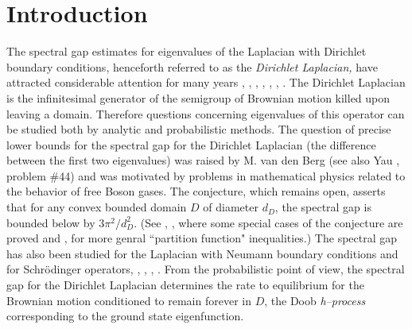 \documentclass[11pt,leqno]{article}
\theoremstyle{definition}
\numberwithin{equation}{section}
\begin{document}
\begin{titlepage}
\begin{abstract}
\smallskip

\centerline{\bf  Contents}
\begin{itemize}
\item[{\S1.}] {\sl Introduction}
\item[\S2.] {\sl  Variational formulas}
\item[\S3.] {\sl Weighted Poincar\'e inequalities}
\item[\S4.] {\sl Proof of Theorems \ref{main} and \ref{upperestimate}}
\item[\S5.] { \sl Concluding Remarks}
\end{itemize}
\end{abstract}
\end{titlepage}







\section{Introduction} 
\label{sec:introduction}

  The spectral gap estimates for eigenvalues of the Laplacian with Dirichlet
boundary conditions, henceforth referred to as the {\it Dirichlet Laplacian,}  have attracted
considerable  attention for many  years
\cite{AB1},
\cite{AB2}, \cite{vanden}, \cite{L}, \cite{Sm}, \cite{SWY}, \cite{YZ} . The Dirichlet
Laplacian is the infinitesimal generator of the semigroup of Brownian
motion killed upon leaving a domain. Therefore questions concerning
eigenvalues of this operator can be studied both by analytic and
probabilistic methods.  The question of  precise  lower bounds for  the spectral gap for
the Dirichlet Laplacian (the difference between the first two eigenvalues)
was raised  by M. van den Berg \cite{vanden} (see also Yau \cite{Yau}, problem \#44) and was
motivated by problems in mathematical physics related to the behavior of free
Boson gases. 
The conjecture, which remains open,  asserts that for any convex bounded domain $D$ of
diameter
$d_D$, the spectral gap is bounded below by $3\pi^2/d_D^2$. (See \cite{BKr}, \cite{BM},
\cite{Da} where some special cases of the conjecture are proved and \cite{DH}, \cite{You} for
more genral ``partition  function" inequalities.)   The spectral gap has also been studied for the
Laplacian with Neumann boundary conditions and for Schr\"odinger operators,
\cite{PW}, \cite{Sm},
\cite{AB1}, \cite{SWY}. 
 From the probabilistic point of view, the
spectral gap for the Dirichlet Laplacian determines the  rate to equilibrium for  the Brownian
motion conditioned to remain forever in
$D$, the Doob \emph{h--process} corresponding to the ground state eigenfunction. 
\end{document}
